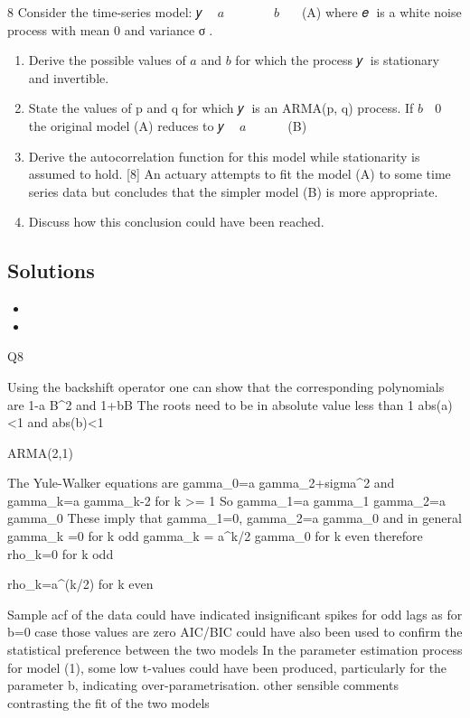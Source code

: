 \documentclass[a4paper,12pt]{article}
\begin{document}



8 Consider the time-series model:
𝑦􀯧 􀵌 $a$ 𝑦􀯧􀬿􀬶 􀵅 𝑒􀯧 􀵅 $b$ 𝑒􀯧􀬿􀬵 (A)
where 𝑒􀯧 is a white noise process with mean 0 and variance σ􀬶.
\begin{enumerate}
\item   Derive the possible values of $a$ and $b$ for which the process 𝑦􀯧 is stationary
and invertible. 
\item   State the values of p and q for which 𝑦􀯧 is an ARMA(p, q) process. 
\medskip
If $b$ 􀵌 0 the original model (A) reduces to
𝑦􀯧 􀵌 $a$ 𝑦􀯧􀬿􀬶 􀵅 𝑒􀯧 (B)
\item  Derive the autocorrelation function for this model while stationarity is
assumed to hold. [8]
An actuary attempts to fit the model (A) to some time series data but concludes that
the simpler model (B) is more appropriate.
\item  Discuss how this conclusion could have been reached. 
\end{enumerate}
\medskip 
\subsection*{Solutions}

\begin{itemize}
\item
\item
\end{itemize}

Q8
\item  
Using the backshift operator one can show that the corresponding polynomials are
1-a B^2 
and
1+bB 
The roots need to be in absolute value less than 1
abs(a)<1 and abs(b)<1 
\item  
ARMA(2,1) 
\item 
The Yule-Walker equations are
gamma_0=a gamma_2+sigma^2 
and
gamma_k=a gamma_{k-2} for k >= 1 
So
\medskip 
gamma_1=a gamma_1 
gamma_2=a gamma_0 
These imply that
gamma_1=0, gamma_2=a gamma_0 and in general 
gamma_k =0 for k odd 
gamma_k = a^{k/2} gamma_0 for k even 
therefore
rho_k=0 for k odd \item 
rho_k=a^(k/2) for k even \item 


\item 
Sample acf of the data could have indicated insignificant spikes for odd lags as
for b=0 case those values are zero 
AIC/BIC could have also been used to confirm the statistical preference between the
two models 
In the parameter estimation process for model (1), some low t-values could have been produced, particularly for the parameter b, indicating over-parametrisation. 
other sensible comments contrasting the fit of the two models 
\end{document}
